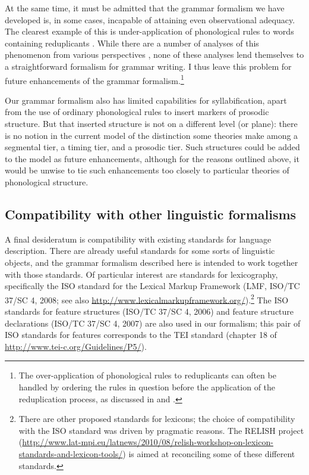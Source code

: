 At the same time, it must be admitted that the grammar formalism we have developed is, in some cases, incapable of attaining even observational adequacy. The clearest example of this is under-application of phonological rules to words containing reduplicants \citep{Wilbur1973}. While there are a number of analyses of this phenomenon from various perspectives \citep{Marantz1982, McCarthyEtAl1995,Raimy2000,InkelasEtAl2005,Frampton2009}, none of these analyses lend themselves to a straightforward formalism for grammar writing. I thus leave this problem for future enhancements of the grammar formalism.\footnote{The
  over-application of phonological rules to reduplicants can often be handled by ordering the rules in question before the application of the reduplication process, as discussed in \citet{Carrier1979} and \citet{Marantz1982}.
}

Our grammar formalism also has limited capabilities for syllabification, apart from the use of ordinary phonological rules to insert markers of prosodic structure. But that inserted structure is not on a different level (or plane): there is no notion in the current model of the distinction some theories make among a segmental tier, a timing tier, and a prosodic tier. Such structures could be added to the model as future enhancements, although for the reasons outlined above, it would be unwise to tie such enhancements too closely to particular theories of phonological structure.

\subsection{Compatibility with other linguistic formalisms}
\label{bkm:RefHeading61467100141}
A final desideratum is compatibility with existing standards for language description. There are already useful standards for some sorts of linguistic objects, and the grammar formalism described here is intended to work together with those standards. Of particular interest are standards for lexicography, specifically the ISO standard for the Lexical Markup Framework (LMF, ISO/TC 37/SC 4, 2008; see also \url{http://www.lexicalmarkupframework.org/}).\footnote{There
  are other proposed standards for lexicons; the choice of compatibility with the ISO standard was driven by pragmatic reasons. The RELISH project (\url{http://www.lat-mpi.eu/latnews/2010/08/relish-workshop-on-lexicon-standards-and-lexicon-tools/}) is aimed at reconciling some of these different standards.} The ISO standards for feature structures (ISO/TC 37/SC 4, 2006) and feature structure declarations (ISO/TC 37/SC 4, 2007) are also used in our formalism; this pair of ISO standards for features corresponds to the TEI standard (chapter 18 of \url{http://www.tei-c.org/Guidelines/P5/}).


